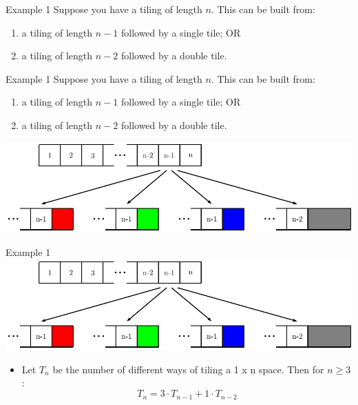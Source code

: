 \documentclass{beamer}
\begin{document}
\begin{frame}{Example 1}
    Suppose you have a tiling of length $n$. This can be built from:
    \begin{enumerate}
        \item a tiling of length $n-1$ followed by a single tile; OR
        \item a tiling of length $n-2$ followed by a double tile.    
    \end{enumerate}
\end{frame}

\begin{frame}{Example 1}
    Suppose you have a tiling of length $n$. This can be built from:
    \begin{enumerate}
        \item a tiling of length $n-1$ followed by a single tile; OR
        \item a tiling of length $n-2$ followed by a double tile.    
    \end{enumerate}
    \vspace{0.5cm}
    \centering
    \includegraphics[width=1\linewidth]{tiling1}    
\end{frame}

\begin{frame}{Example 1}
    \centering 
    \includegraphics[width=0.8\linewidth]{tiling1} 
    \begin{itemize}
        \item Let $T_n$ be the number of different ways of tiling a 1 x n space. Then for $n \geq 3$:
        \begin{equation}\tag{1}
            T_n = 3 \cdot T_{n-1} + 1 \cdot T_{n-2}
        \end{equation}
    \end{itemize}
\end{frame}
\end{document}
